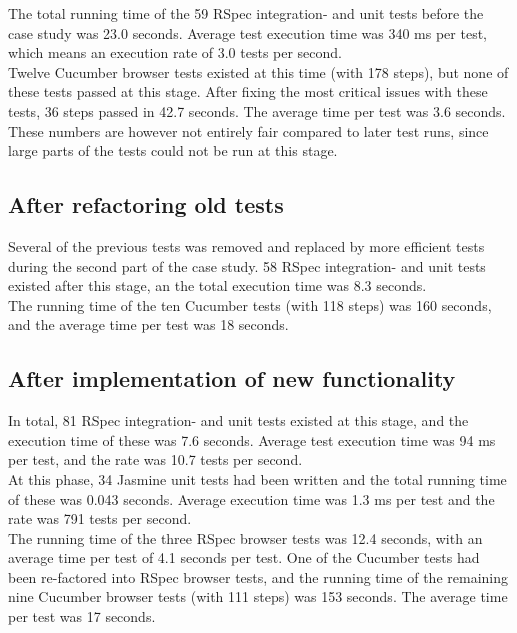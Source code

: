 The total running time of the 59 RSpec integration- and unit tests
before the case study was 23.0 seconds. Average test execution time was
340 ms per test, which means an execution rate of 3.0 tests per
second.\\

Twelve Cucumber browser tests existed at this time (with 178 steps), but
none of these tests passed at this stage. After fixing the most critical
issues with these tests, 36 steps passed in 42.7 seconds. The average
time per test was 3.6 seconds. These numbers are however not entirely
fair compared to later test runs, since large parts of the tests could
not be run at this stage.\\


\subsection{After refactoring old tests}

Several of the previous tests was removed and replaced by more efficient
tests during the second part of the case study. 58 RSpec integration-
and unit tests existed after this stage, an the total execution time was
8.3 seconds.\\

The running time of the ten Cucumber tests (with 118 steps) was 160
seconds, and the average time per test was 18 seconds.\\


\subsection{After implementation of new functionality}

In total, 81 RSpec integration- and unit tests existed at this stage,
and the execution time of these was 7.6 seconds. Average test execution
time was 94 ms per test, and the rate was 10.7 tests per
second.\\

At this phase, 34 Jasmine unit tests had been written and the total
running time of these was 0.043 seconds. Average execution time was 1.3
ms per test and the rate was 791 tests per second.\\

The running time of the three RSpec browser tests was 12.4 seconds, with
an average time per test of 4.1 seconds per test. One of the Cucumber
tests had been re-factored into RSpec browser tests, and the running
time of the remaining nine Cucumber browser tests (with 111 steps) was
153 seconds. The average time per test was 17 seconds.\\
